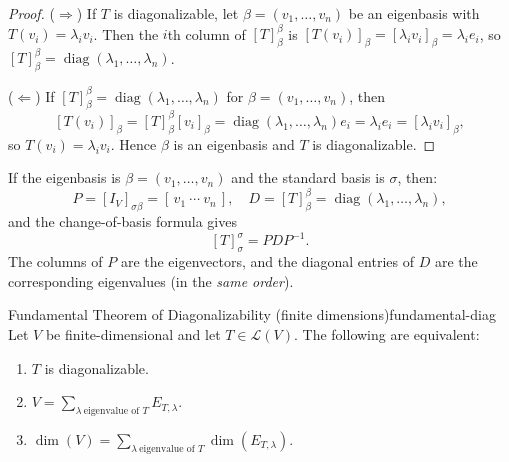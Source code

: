 \begin{proof}
($\Rightarrow$) If $T$ is diagonalizable, let $\beta=(v_1,\dots,v_n)$ be an eigenbasis with $T(v_i)=\lambda_i v_i$.
Then the $i$th column of $[T]_{\beta}^{\beta}$ is $[T(v_i)]_{\beta}=[\lambda_i v_i]_{\beta}=\lambda_i e_i$, so $[T]_{\beta}^{\beta}=\operatorname{diag}(\lambda_1,\dots,\lambda_n)$.

($\Leftarrow$) If $[T]_{\beta}^{\beta}=\operatorname{diag}(\lambda_1,\dots,\lambda_n)$ for $\beta=(v_1,\dots,v_n)$, then
\[
[T(v_i)]_{\beta}=[T]_{\beta}^{\beta}[v_i]_{\beta}=\operatorname{diag}(\lambda_1,\dots,\lambda_n)e_i=\lambda_i e_i=[\lambda_i v_i]_{\beta},
\]
so $T(v_i)=\lambda_i v_i$. Hence $\beta$ is an eigenbasis and $T$ is diagonalizable.
\end{proof}

\begin{examtip}[title={Exam Focus: reading diagonalization as $A=PDP^{-1}$}]
If the eigenbasis is $\beta=(v_1,\dots,v_n)$ and the standard basis is $\sigma$, then:
\[
P = [I_V]_{\sigma\beta} = [\,v_1\ \cdots\ v_n\,],\quad D = [T]_\beta^\beta = \operatorname{diag}(\lambda_1,\dots,\lambda_n),
\]
and the change-of-basis formula gives
\[
[T]_\sigma^\sigma = P D P^{-1}.
\]
The columns of $P$ are the eigenvectors, and the diagonal entries of $D$ are the corresponding eigenvalues (in the \emph{same order}).
\end{examtip}

\begin{theorem}{Fundamental Theorem of Diagonalizability (finite dimensions)}{fundamental-diag}
Let $V$ be finite-dimensional and let $T\in\mathcal{L}(V)$. The following are equivalent:
\begin{enumerate}[label=(\alph*),leftmargin=*]
\item $T$ is diagonalizable.
\item $V=\sum_{\lambda\ \text{eigenvalue of }T} E_{T,\lambda}$.
\item $\dim(V)=\sum_{\lambda\ \text{eigenvalue of }T}\dim(E_{T,\lambda})$.
\end{enumerate}
\end{theorem}

